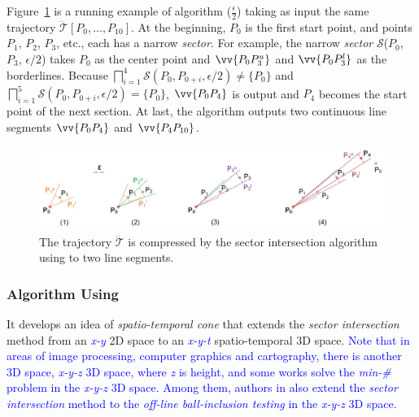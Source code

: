 \begin{example}
	\label{exm-alg-sleeve}
	Figure~\ref{fig:sleeve} is a running example of algorithm \siped($\frac{\epsilon}{2}$) taking as input the same trajectory $\dddot{\mathcal{T}}[P_0, \ldots, P_{10}]$. At the beginning, $P_0$ is the first start point, and points $P_1$, $P_2$, $P_3$, etc., each has a narrow \emph{sector}.
	For example, the narrow \emph{sector} $\mathcal{S}$($P_0$, $P_{3}$, $\epsilon/2$) takes $P_0$ as the center point and $\vv{P_0P^u_{3}}$ and $\vv{P_0P^l_{3}}$ as the borderlines.
	Because $\bigsqcap_{i=1}^{4}\mathcal{S}(P_0, P_{0+i}, \epsilon/2) \ne \{P_0\}$ and $\bigsqcap_{i=1}^{5}\mathcal{S}(P_0, P_{0+i}, \epsilon/2) = \{P_0\}$, $\vv{P_0P_4}$ is output and $P_4$ becomes the start point of the next section.
	At last, the algorithm outputs two continuous line segments $\vv{P_0P_4}$ and $\vv{P_4P_{10}}$.
\end{example}

\begin{figure}[tb!]
	\centering
	\includegraphics[scale=0.66]{Figures/Fig-sleeve.jpg}
	\vspace{-2ex}
	\caption{\small The trajectory $\dddot{\mathcal{T}}$ is compressed by the sector intersection algorithm using \ped to two line segments.}
	\vspace{-1ex}
	\label{fig:sleeve}
\end{figure}




\subsubsection{Algorithm \cised Using \sed \cite{Lin:Cised}}
It develops an idea of \textit{spatio-temporal cone} that extends the \textit{sector intersection} method \cite{Williams:Longest, Sklansky:Cone, Dunham:Cone, Zhao:Sleeve} from an \textcolor{blue}{\em x-y} 2D space to an \textcolor{blue}{\em x-y-t} spatio-temporal 3D space.
\textcolor{blue}{Note that in areas of image processing, computer graphics and cartography, there is another 3D space, \ie \emph{x-y-z} 3D space, where {\em z} is height, and some works \cite{Barequet:3D, Eu:Ln3D} solve the \emph{min-\#} problem in the \emph{x-y-z} 3D space. Among them, authors in \cite{Barequet:3D} also extend the \textit{sector intersection} method to the \textit{off-line ball-inclusion testing} in the \emph{x-y-z} 3D space.} %

